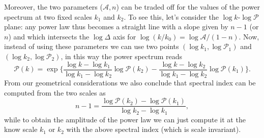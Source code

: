 Moreover, the two parameters ($\mathcal A, n$) can be traded off for the values of the power spectrum at two fixed scales $k_1$ and $k_2$. To see this, let's consider the $\log k$-$\log\mathcal P$ plane: any power law thus becomes a straight line with a slope given by $n-1$ (or $n$) and which intersects the $\log\Delta$ axis for $\log (k/k_0)=\log\mathcal A/(1-n)$. Now, instead of using these parameters we can use two points $(\log k_1,\log\mathcal P_1)$ and $(\log k_2,\log\mathcal P_2)$, in this way the power spectrum reads
\begin{equation}\label{eq:2_scales_PS}
    \mathcal P(k)=\exp\bigg\{\frac{\log k-\log k_1}{\log k_1 -\log k_2}\log\mathcal P(k_2)-\frac{\log k-\log k_2}{\log k_1 -\log k_2}\log\mathcal P(k_1)\bigg\}.
\end{equation}
From our geometrical considerations we also conclude that spectral index can be computed from the two scales as
$$n-1=\frac{\log\mathcal P(k_2)-\log\mathcal P(k_1)}{\log k_2-\log k_1},$$
while to obtain the amplitude of the power law we can just compute it at the know scale $k_1$ or $k_2$ with the above spectral index (which is scale invariant).
